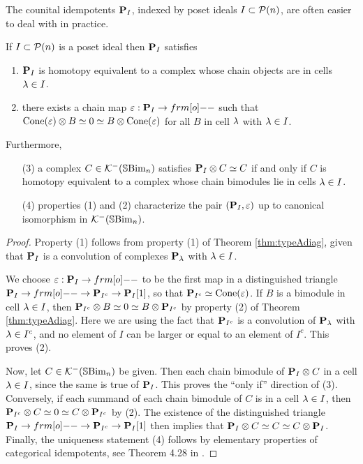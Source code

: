 The counital idempotents ${\mathbf P}_I$, indexed by poset ideals $I\subset {\mathcal{P}}(n)$, are often easier to deal with in practice. 
\begin{proposition}\label{prop:counitalChar}
If $I\subset {\mathcal{P}}(n)$ is a poset ideal then ${\mathbf P}_I$ satisfies
\begin{enumerate}
\item ${\mathbf P}_I$ is homotopy equivalent to a complex whose chain objects are in cells $\lambda\in I$.
\item there exists a chain map $\e:\PB_I\rightarrow \one$ such that $\operatorname{Cone}(\varepsilon)\otimes B\simeq 0 \simeq B\otimes \operatorname{Cone}(\varepsilon)$ for all $B$ in cell $\lambda$ with $\lambda\in I$.
\end{enumerate}
Furthermore,
\begin{enumerate}
\item[(3)] a complex $C\in {\mathcal{K}}^-({\mathbb{S}}{\rm Bim }_n)$ satisfies ${\mathbf P}_I\otimes C\simeq C$ if and only if $C$ is homotopy equivalent to a complex whose chain bimodules lie in cells $\lambda \in I$.
\item[(4)] properties (1) and (2) characterize the pair $({\mathbf P}_I,\varepsilon)$ up to canonical isomorphism in ${\mathcal{K}}^-({\mathbb{S}}{\rm Bim }_n)$.
\end{enumerate}
\end{proposition}
\begin{proof}
Property (1) follows from property (1) of Theorem \ref{thm:typeAdiag}, given that ${\mathbf P}_I$ is a convolution of complexes ${\mathbf P}_\lambda$ with $\lambda\in I$.


We choose $\e:\PB_I\rightarrow \one$ to be the first map in a distinguished triangle $\PB_I\rightarrow \one\rightarrow \PB_{I^c}\rightarrow \PB_I[1]$, so that ${\mathbf P}_{I^c} \simeq \operatorname{Cone}(\varepsilon)$.  If $B$ is a bimodule in cell $\lambda\in I$, then ${\mathbf P}_{I^c}\otimes B\simeq 0\simeq B\otimes {\mathbf P}_{I^c}$ by property (2) of Theorem \ref{thm:typeAdiag}.  Here we are using the fact that ${\mathbf P}_{I^c}$ is a convolution of ${\mathbf P}_\lambda$ with $\lambda\in I^c$, and no element of $I$ can be larger or equal to an element of $I^c$.  This proves (2).

Now, let $C\in {\mathcal{K}}^-({\mathbb{S}}{\rm Bim }_n)$ be given.  Then each chain bimodule of ${\mathbf P}_I\otimes C$ in a cell $\lambda\in I$, since the same is true of ${\mathbf P}_I$.  This proves the ``only if'' direction of (3).  Conversely, if each summand of each chain bimodule of $C$ is in a cell $\lambda\in I$, then ${\mathbf P}_{I^c}\otimes C\simeq 0\simeq C\otimes {\mathbf P}_{I^c}$ by (2). The existence of the distinguished triangle $\PB_I\rightarrow \one\rightarrow \PB_{I^c}\rightarrow \PB_I[1]$ then implies that ${\mathbf P}_I\otimes C\simeq C\simeq C\otimes {\mathbf P}_I$.  Finally, the uniqueness statement (4) follows by elementary properties of categorical idempotents, see Theorem 4.28 in \cite{Hog17a}. 
\end{proof}

